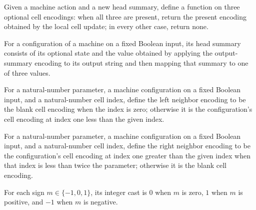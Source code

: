 \begin{definition}
\label{Complexity.Codec.stepG}
\leanok
{}
Given a machine action and a new head summary, define a function on three optional cell
encodings: when all three are present, return the present encoding obtained by the local
cell update; in every other case, return none.
\end{definition}

\begin{definition}
\label{Complexity.Codec.hdOf}
\leanok
{}
For a configuration of a machine on a fixed Boolean input, its head summary consists of
its optional state and the value obtained by applying the output-summary encoding to its
output string and then mapping that summary to one of three values.
\end{definition}

\begin{definition}
\label{Complexity.Codec.nbL}
\leanok
{}
For a natural-number parameter, a machine configuration on a fixed Boolean input, and a
natural-number cell index, define the left neighbor encoding to be the blank cell
encoding when the index is zero; otherwise it is the configuration's cell encoding at
index one less than the given index.
\end{definition}

\begin{definition}
\label{Complexity.Codec.nbR}
\leanok
{}
For a natural-number parameter, a machine configuration on a fixed Boolean input, and a
natural-number cell index, define the right neighbor encoding to be the configuration's
cell encoding at index one greater than the given index when that index is less than
twice the parameter; otherwise it is the blank cell encoding.
\end{definition}

\begin{lemma}
\label{Complexity.Codec.signType_cast}
\leanok
{}
For each sign $m\in\{-1,0,1\}$, its integer cast is $0$ when $m$ is zero, $1$ when $m$
is positive, and $-1$ when $m$ is negative.
\end{lemma}

